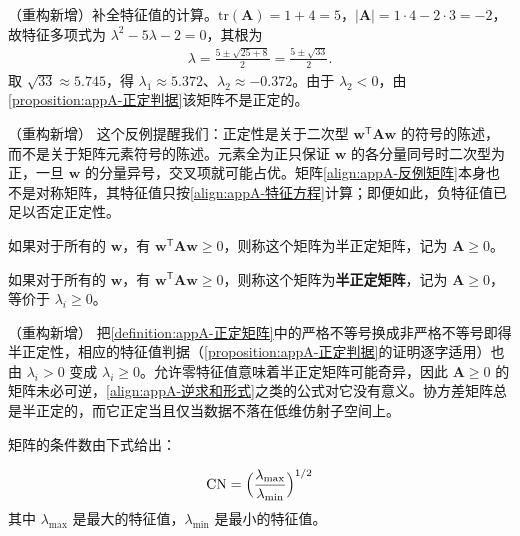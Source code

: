 \documentclass[../main.tex]{subfiles}
\begin{document}
\begin{solution}
（重构新增）补全特征值的计算。$\mathrm{tr}(\bm{A})=1+4=5$，$|\bm{A}|=1\cdot4-2\cdot3=-2$，故特征多项式为 $\lambda^{2}-5\lambda-2=0$，其根为
\begin{align*}
  \lambda=\frac{5\pm\sqrt{25+8}}{2}=\frac{5\pm\sqrt{33}}{2}.
\end{align*}
取 $\sqrt{33}\approx5.745$，得 $\lambda_1\approx5.372$、$\lambda_2\approx-0.372$。由于 $\lambda_2<0$，由\cref{proposition:appA-正定判据}该矩阵不是正定的。
\end{solution}

\begin{remark}（重构新增）
这个反例提醒我们：正定性是关于二次型 $\bm{w}^{\mathsf{T}}\bm{A}\bm{w}$ 的符号的陈述，而不是关于矩阵元素符号的陈述。元素全为正只保证 $\bm{w}$ 的各分量同号时二次型为正，一旦 $\bm{w}$ 的分量异号，交叉项就可能占优。矩阵\eqref{align:appA-反例矩阵}本身也不是对称矩阵，其特征值只按\eqref{align:appA-特征方程}计算；即便如此，负特征值已足以否定正定性。
\end{remark}

如果对于所有的 $\bm{w}$，有 $\bm{w}^{\mathsf{T}}\bm{A}\bm{w}\geqslant0$，则称这个矩阵为半正定矩阵，记为 $\bm{A}\geqslant0$。

\begin{definition}[半正定矩阵]\label{definition:appA-半正定矩阵}
如果对于所有的 $\bm{w}$，有 $\bm{w}^{\mathsf{T}}\bm{A}\bm{w}\geqslant0$，则称这个矩阵为\textbf{半正定矩阵}，记为 $\bm{A}\geqslant0$，等价于 $\lambda_i\geqslant0$。
\end{definition}

\begin{remark}（重构新增）
把\cref{definition:appA-正定矩阵}中的严格不等号换成非严格不等号即得半正定性，相应的特征值判据（\cref{proposition:appA-正定判据}的证明逐字适用）也由 $\lambda_i>0$ 变成 $\lambda_i\geqslant0$。允许零特征值意味着半正定矩阵可能奇异，因此 $\bm{A}\geqslant0$ 的矩阵未必可逆，\eqref{align:appA-逆求和形式}之类的公式对它没有意义。协方差矩阵总是半正定的，而它正定当且仅当数据不落在低维仿射子空间上。
\end{remark}

矩阵的条件数由下式给出：
\begin{definition}[条件数]\label{definition:appA-条件数}
\begin{align}
  \mathrm{CN}=\Bigl(\frac{\lambda_{\max}}{\lambda_{\min}}\Bigr)^{1/2}
  \label{align:appA-条件数}
\end{align}
其中 $\lambda_{\max}$ 是最大的特征值，$\lambda_{\min}$ 是最小的特征值。
\end{definition}
\end{document}
